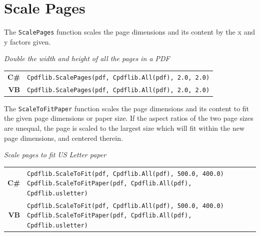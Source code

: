 \documentclass[a4paper]{memoir}
\begin{document}
\section{Scale Pages}
The \verb!ScalePages! function scales the page dimensions and its content by the x and y factors given.

\begin{framed}
\noindent\textit{Double the width and height of all the pages in a PDF}

\vspace{2mm}
\noindent\begin{tabular}{rl}
\small\sffamily\textbf{C\#} &
\begin{minipage}{4in}
\small\verb!Cpdflib.ScalePages(pdf, Cpdflib.All(pdf), 2.0, 2.0)!
\end{minipage}\\[5mm]
\small\sffamily\textbf{VB} &
\begin{minipage}{4in}
\small\verb!Cpdflib.ScalePages(pdf, Cpdflib.All(pdf), 2.0, 2.0)!
\end{minipage}\\[5mm]
\end{tabular}
\end{framed}

The \verb!ScaleToFitPaper! function scales the page dimensions and its content
to fit the given page dimensions or paper size. If the aspect ratios of the two
page sizes are unequal, the page is scaled to the largest size which will fit
within the new page dimensions, and centered therein.

\begin{framed}
\noindent\textit{Scale pages to fit US Letter paper}

\vspace{2mm}
\noindent\begin{tabular}{rl}
\small\sffamily\textbf{C\#} &
\begin{minipage}{4in}
\small\verb!Cpdflib.ScaleToFit(pdf, Cpdflib.All(pdf), 500.0, 400.0)!
\small\verb!Cpdflib.ScaleToFitPaper(pdf, Cpdflib.All(pdf), Cpdflib.usletter)!
\end{minipage}\\[5mm]
\small\sffamily\textbf{VB} &
\begin{minipage}{4in}
\small\verb!Cpdflib.ScaleToFit(pdf, Cpdflib.All(pdf), 500.0, 400.0)!
\small\verb!Cpdflib.ScaleToFitPaper(pdf, Cpdflib.All(pdf), Cpdflib.usletter)!
\end{minipage}\\[5mm]
\end{tabular}
\end{framed}
\end{document}
